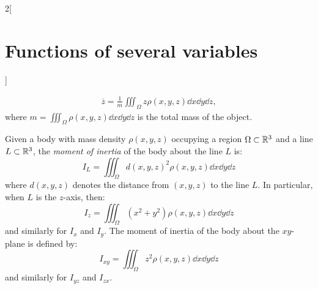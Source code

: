 \documentclass[../../../main.tex]{subfiles}
\begin{document}
\begin{multicols}{2}[\section{Functions of several variables}]
\begin{definition}
\begin{gather*}
      \overline{z}=\frac{1}{m}\iiint_\Omega z\rho(x,y,z)\dd{x}\dd{y}\dd{z},
    \end{gather*}
    where $\displaystyle m=\iiint_\Omega\rho(x,y,z)\dd{x}\dd{y}\dd{z}$ is the total mass of the object.
  \end{definition}
  \begin{definition}
    Given a body with mass density $\rho(x,y,z)$ occupying a region $\Omega\subset\mathbb{R}^3$ and a line $L\subset\mathbb{R}^3$, the \emph{moment of inertia} of the body about the line $L$ is: $$I_L=\iiint_\Omega d(x,y,z)^2\rho(x,y,z)\dd{x}\dd{y}\dd{z}$$ where $d(x,y,z)$ denotes the distance from $(x,y,z)$ to the line $L$. In particular, when $L$ is the $z$-axis, then: $$I_z=\iiint_\Omega (x^2+y^2)\rho(x,y,z)\dd{x}\dd{y}\dd{z}$$ and similarly for $I_x$ and $I_y$. The moment of inertia of the body about the $xy$-plane is defined by: $$I_{xy}=\iiint_\Omega z^2\rho(x,y,z)\dd{x}\dd{y}\dd{z}$$ and similarly for $I_{yz}$ and $I_{zx}.$
  \end{definition}

\end{multicols}
\end{document}
